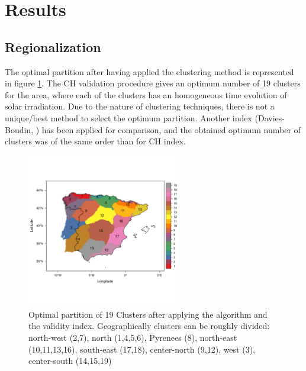  

\section{Results}

\subsection{Regionalization}

The optimal partition after having applied the clustering method is represented in figure \ref{clusters}. The CH validation procedure gives an optimum number of 19 clusters for the area, where each of the clusters has an homogeneous time evolution of solar irradiation. Due to the nature of clustering techniques, there is not a unique/best method to select the optimum partition. Another index (Davies-Boudin, \cite{davies1979cluster}) has been applied for comparison, and the obtained optimum number of clusters was of the same order than for CH index.
 
\begin{figure}[h!]
\centering\includegraphics[width=0.6\textwidth]{figs/capitulo5/clusters2}
\caption[Optimal partition of clusters over the Iberian Peninsula]{Optimal partition of 19 Clusters after applying the algorithm and the validity index. Geographically clusters can be roughly divided: north-west (2,7), north (1,4,5,6), Pyrenees (8), north-east (10,11,13,16), south-east (17,18), center-north (9,12), west (3), center-south (14,15,19)}
\label{clusters}
\end{figure}

